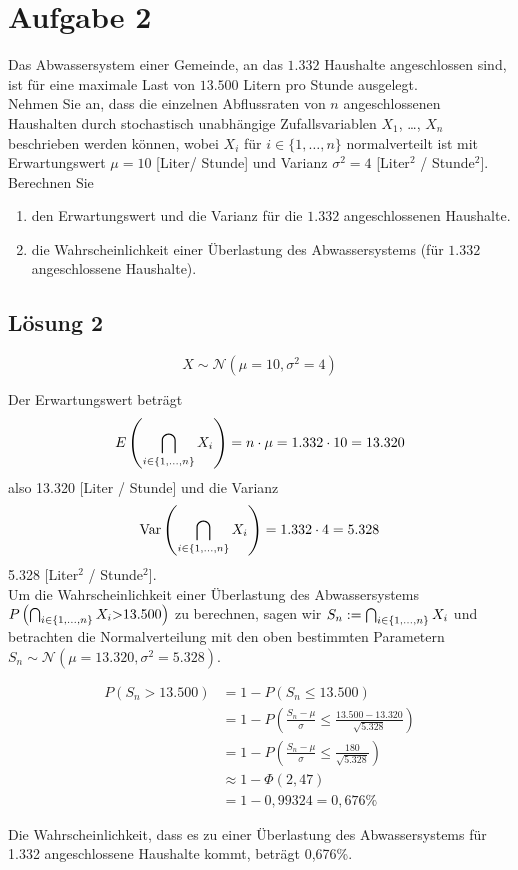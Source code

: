 \documentclass[main.tex]{subfiles}
\begin{document}
\section{Aufgabe 2}
Das Abwassersystem einer Gemeinde, an das $1.332$ Haushalte angeschlossen sind, ist für eine maximale Last von $13.500$ Litern pro Stunde ausgelegt. \\[1mm]
Nehmen Sie an, dass die einzelnen Abflussraten von $n$ angeschlossenen Haushalten durch stochastisch unabhängige Zufallsvariablen $X_1$, \dots, $X_n$ beschrieben werden können, wobei $X_i$ für $i \in \{ 1, \dots, n \}$ normalverteilt ist mit Erwartungswert $\mu = 10$ [Liter/ Stunde] und Varianz $\sigma^2 = 4$ [Liter$^2$ / Stunde$^2$].\\

Berechnen Sie 
\begin{enumerate}
\item den Erwartungswert und die Varianz für die $1.332$ angeschlossenen Haushalte.
\item die Wahrscheinlichkeit einer Überlastung des Abwassersystems (für $1.332$ angeschlossene Haushalte).
\end{enumerate}

\subsection{Lösung 2}
$$
    X\sim \mathcal{N}(\mu {=} 10, \sigma^2 {=} 4)
$$

Der Erwartungswert beträgt
$$
    E\left(\bigcap_{i\in\{1,\dots,n\}} X_i\right) = n\cdot \mu = 1.332\cdot 10 = 13.320
$$
also 13.320 [Liter / Stunde] und die Varianz $$
    \operatorname{Var}\left(\bigcap_{i\in\{1,\dots,n\}} X_i\right) = 1.332 \cdot 4 = 5.328
$$
5.328 [Liter$^2$ / Stunde$^2$].\\

Um die Wahrscheinlichkeit einer Überlastung des Abwassersystems $P\left(\bigcap_{i\in\{1,\dots,n\}} X_i {>} 13.500\right)$ zu berechnen, sagen wir $S_n := \bigcap_{i\in\{1,\dots,n\}} X_i$ und betrachten die Normalverteilung mit den oben bestimmten Parametern $S_n \sim \mathcal{N}(\mu {=} 13.320, \sigma^2 {=} 5.328)$.

$$\begin{aligned}
    P(S_n {>} 13.500) &= 1 - P(S_n {\leq} 13.500) \\
    &= 1 - P\left(\frac{S_n - \mu}{\sigma} {\leq} \frac{13.500-13.320}{\sqrt{5.328}}\right) \\
    &= 1 - P\left(\frac{S_n - \mu}{\sigma} {\leq} \frac{180}{\sqrt{5.328}}\right) \\
    &\approx 1 - \Phi (2,47)\\
    &= 1 - 0,99324 = 0,676 \%
\end{aligned}$$

Die Wahrscheinlichkeit, dass es zu einer Überlastung des Abwassersystems für 1.332 angeschlossene Haushalte kommt, beträgt 0,676\%. 
\end{document}
